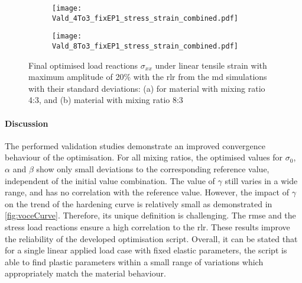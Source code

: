 \begin{figure}[H]
\centering

\begin{subfigure}[t]{0.495\textwidth}
    \centering
    \texttt{[image: Vald\_4To3\_fixEP1\_stress\_strain\_combined.pdf]}
    \caption{}
    \label{fig:validStressStrain4to3}
\end{subfigure}
\hfill
\begin{subfigure}[t]{0.495\textwidth}
    \centering
    \texttt{[image: Vald\_8To3\_fixEP1\_stress\_strain\_combined.pdf]}
    \caption{}
    \label{fig:validStressStrain8to3}
\end{subfigure}
\caption{Final optimised load reactions $\sigma_{xx}$ under linear tensile strain with maximum amplitude of 20\% with the \acrfull{rlr} from the \acrshort{md} simulations with their standard deviations: (a) for material with mixing ratio 4:3, and (b) material with mixing ratio 8:3}
\label{fig:validStressStrain4and8}
\end{figure}


\paragraph{Discussion}
The performed validation studies demonstrate an improved convergence behaviour of the optimisation. For all mixing ratios, the optimised values for $\sigma_0$, $\alpha$ and $\beta$ show only small deviations to the corresponding  reference value, independent of the initial value combination. The value of $\gamma$ still varies in a wide range, and has no correlation with the reference value. However, the impact of $\gamma$ on the trend of the hardening curve is relatively small as demonstrated in \autoref{fig:voceCurve}. Therefore, its unique definition is challenging. The \acrshort{rmse} and the stress load reactions ensure a high correlation to the \acrlong{rlr}. These results improve the reliability of the developed optimisation script. Overall, it can be stated that for a single linear applied load case with fixed elastic parameters, the script is able to find plastic parameters within a small range of variations which appropriately match the material behaviour.



